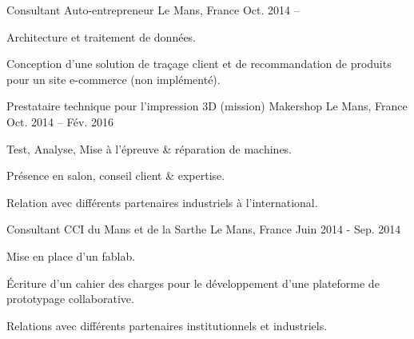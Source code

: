 

\begin{cventries}

  \cventry
    {Consultant} %
    {Auto-entrepreneur} %
    {Le Mans, France} %
    {Oct. 2014 -- } %
    {
      \begin{cvitems} %
				\item {Architecture et traitement de données.}
				\item {Conception d'une solution de traçage client et de recommandation de produits pour un site e-commerce (non implémenté).}
      \end{cvitems}
    }

  \cventry
		{Prestataire technique pour l'impression 3D (mission)} %
    {Makershop} %
    {Le Mans, France} %
    {Oct. 2014 -- Fév. 2016} %
    {
      \begin{cvitems} %
				\item {Test, Analyse, Mise à l'épreuve \& réparation de machines.}
				\item {Présence en salon, conseil client \& expertise.}
				\item {Relation avec différents partenaires industriels à l'international.}
      \end{cvitems}
    }

  \cventry
    {Consultant} %
    {CCI du Mans et de la Sarthe} %
    {Le Mans, France} %
    {Juin 2014 - Sep. 2014} %
    {
      \begin{cvitems} %
        \item {Mise en place d'un fablab.}
        \item {Écriture d'un cahier des charges pour le développement d'une plateforme de prototypage collaborative.}
				\item {Relations avec différents partenaires institutionnels et industriels.}
      \end{cvitems}
    }

\end{cventries}
